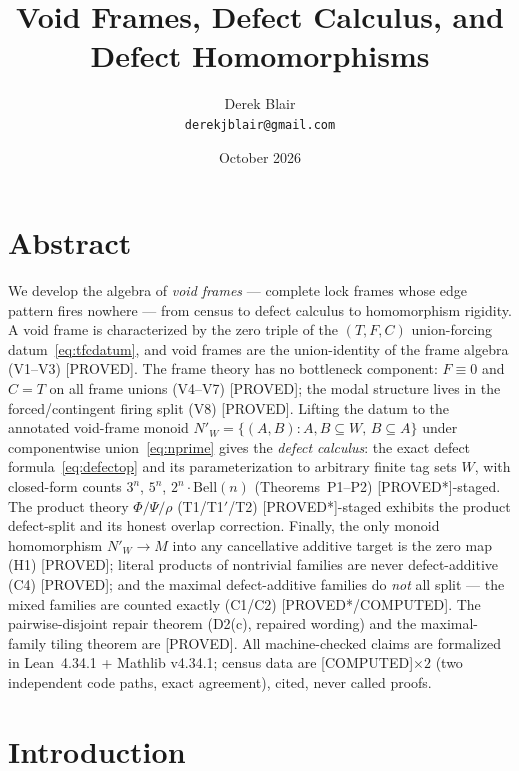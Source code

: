 \documentclass[11pt,a4paper]{article}
\title{Void Frames, Defect Calculus, and Defect Homomorphisms}
\author{Derek Blair \\ \texttt{derekjblair@gmail.com}}
\date{October 2026}
\theoremstyle{definition}
\begin{document}
\maketitle

\section{Abstract}

We develop the algebra of \emph{void frames} — complete lock frames
whose edge pattern fires nowhere — from census to defect calculus to
homomorphism rigidity. A void frame is characterized by the zero triple
of the $(T,F,C)$ union-forcing datum~\eqref{eq:tfcdatum}, and void frames
are the union-identity of the frame algebra (V1--V3) [PROVED]. The frame
theory has no bottleneck component: $F\equiv0$ and $C=T$ on all frame
unions (V4--V7) [PROVED]; the modal structure lives in the
forced/contingent firing split (V8) [PROVED]. Lifting the datum to the
annotated void-frame monoid $N'_W=\{(A,B):A,B\subseteq W,\,B\subseteq A\}$
under componentwise union~\eqref{eq:nprime} gives the \emph{defect
calculus}: the exact defect formula~\eqref{eq:defectop} and its
parameterization to arbitrary finite tag sets $W$, with closed-form
counts $3^n$, $5^n$, $2^n\!\cdot\!\mathrm{Bell}(n)$
(Theorems~P1--P2) [PROVED*]-staged. The product theory
$\Phi/\Psi/\rho$ (T1/T1$'$/T2) [PROVED*]-staged exhibits the product
defect-split and its honest overlap correction. Finally, the only
monoid homomorphism $N'_W\to M$ into any cancellative additive target is
the zero map (H1) [PROVED]; literal products of nontrivial families are
never defect-additive (C4) [PROVED]; and the maximal defect-additive
families do \emph{not} all split — the mixed families are counted exactly
(C1/C2) [PROVED*/COMPUTED]. The pairwise-disjoint repair theorem
(D2(c), repaired wording) and the maximal-family tiling theorem are
[PROVED]. All machine-checked claims are formalized in Lean~4.34.1 +
Mathlib v4.34.1; census data are [COMPUTED]$\times2$ (two independent
code paths, exact agreement), cited, never called proofs.

\section{Introduction}
\end{document}
